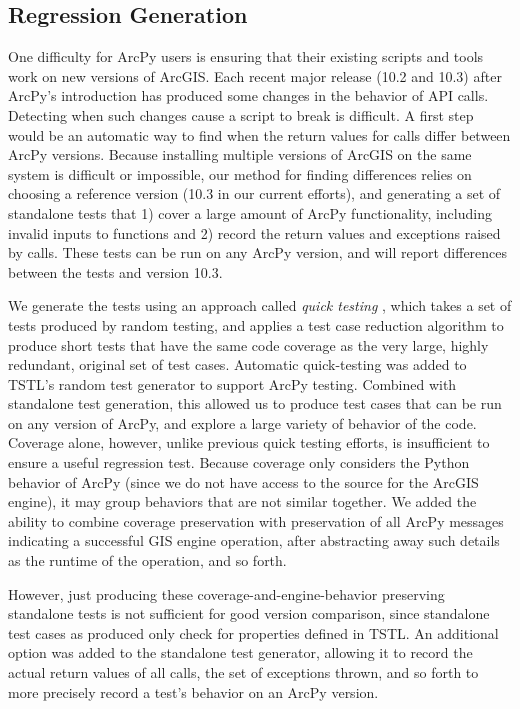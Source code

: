 \subsection{Regression Generation}

One difficulty for ArcPy users is ensuring that their existing scripts
and tools work on new versions of ArcGIS.  Each recent major release
(10.2 and 10.3) after ArcPy's introduction has produced some changes
in the behavior of API calls.  Detecting when such changes cause a
script to break is difficult.  A first step would be an automatic way
to find when the return values for calls differ between ArcPy
versions.
Because installing multiple versions of ArcGIS on the same system is
difficult or impossible, our method for finding differences relies on
choosing a reference version (10.3 in our current efforts), and
generating a set of standalone tests that 1) cover a large amount of
ArcPy functionality, including invalid inputs to functions and 2)
record the return values and exceptions raised by calls.  These tests
can be run on any ArcPy version, and will report differences between
the tests and version 10.3.

We generate the tests using an approach called \emph{quick testing}
\cite{icst2014,stvrcausereduce}, which takes a set of tests produced
by random testing, and applies a test case reduction algorithm
\cite{DD} to produce short tests that have the same code coverage as
the very large, highly redundant, original set of test cases.
Automatic quick-testing was added to TSTL's random test generator to
support ArcPy testing.  Combined with standalone test generation, this
allowed us to produce test cases that can be run on any version of
ArcPy, and explore a large variety of behavior of the code.  Coverage
alone, however, unlike previous quick testing efforts, is insufficient
to ensure a useful regression test.  Because coverage only considers
the Python behavior of ArcPy (since we do not have access to the
source for the ArcGIS engine), it may group behaviors that are not
similar together.  We added the ability to combine coverage
preservation with preservation of all ArcPy messages indicating a
successful GIS engine operation, after abstracting away such details
as the runtime of the operation, and so forth.

However, just producing these coverage-and-engine-behavior preserving
standalone tests is not sufficient for good version comparison, since
standalone test cases as produced only check for properties defined in TSTL.  An
additional option was added to the standalone test generator, allowing
it to record the actual return values of all calls, the set of
exceptions thrown, and so forth to more precisely record a test's
behavior on an ArcPy version.
